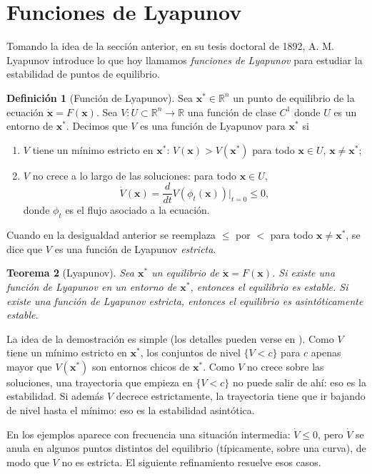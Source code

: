 \documentclass[12pt, a4paper]{amsbook}
\newcommand{\R}{{\mathbb R}}
\newcommand{\xx}{{\mathbf x}}
\newtheorem{teo}{Teorema}[section]
\theoremstyle{remark}
\theoremstyle{definition}
\newtheorem{defi}[teo]{Definición}
\numberwithin{section}{chapter}
\numberwithin{subsection}{section}
\numberwithin{equation}{section}
\numberwithin{figure}{chapter}
\begin{document}
\section{Funciones de Lyapunov}

Tomando la idea de la sección anterior, en su tesis doctoral de 1892, A. M. Lyapunov introduce lo que hoy llamamos {\em funciones de Lyapunov} para estudiar la estabilidad de puntos de equilibrio.

\begin{defi}[Función de Lyapunov]
Sea $\xx^*\in\R^n$ un punto de equilibrio de la ecuación $\dot\xx = F(\xx)$. Sea $V\colon U\subset\R^n\to\R$ una función de clase $C^1$ donde $U$ es un entorno de $\xx^*$. Decimos que $V$ es una función de Lyapunov para $\xx^*$ si
\begin{enumerate}
\item $V$ tiene un mínimo estricto en $\xx^*$: $V(\xx)> V(\xx^*)$ para todo $\xx\in U$, $\xx\neq \xx^*$;
\item $V$ no crece a lo largo de las soluciones: para todo $\xx\in U$,
$$
\dot V(\xx) = \frac{d}{dt}V(\phi_t(\xx))\Big|_{t=0}\le 0,
$$
donde $\phi_t$ es el flujo asociado a la ecuación.
\end{enumerate}
Cuando en la desigualdad anterior se reemplaza $\le$ por $<$ para todo $\xx\neq\xx^*$, se dice que $V$ es una función de Lyapunov \emph{estricta}.
\end{defi}

\begin{teo}[Lyapunov]\label{teo:lyapunov}
Sea $\xx^*$ un equilibrio de $\dot\xx = F(\xx)$. Si existe una función de Lyapunov en un entorno de $\xx^*$, entonces el equilibrio es estable. Si existe una función de Lyapunov estricta, entonces el equilibrio es asintóticamente estable.
\end{teo}

La idea de la demostración es simple (los detalles pueden verse en \cite{Hirsch-Smale}). Como $V$ tiene un mínimo estricto en $\xx^*$, los conjuntos de nivel $\{V< c\}$ para $c$ apenas mayor que $V(\xx^*)$ son entornos chicos de $\xx^*$. Como $V$ no crece sobre las soluciones, una trayectoria que empieza en $\{V<c\}$ no puede salir de ahí: eso es la estabilidad. Si además $V$ decrece estrictamente, la trayectoria tiene que ir bajando de nivel hasta el mínimo: eso es la estabilidad asintótica.

En los ejemplos aparece con frecuencia una situación intermedia: $\dot V\le 0$, pero $\dot V$ se anula en algunos puntos distintos del equilibrio (típicamente, sobre una curva), de modo que $V$ no es estricta. El siguiente refinamiento resuelve esos casos.
\end{document}
